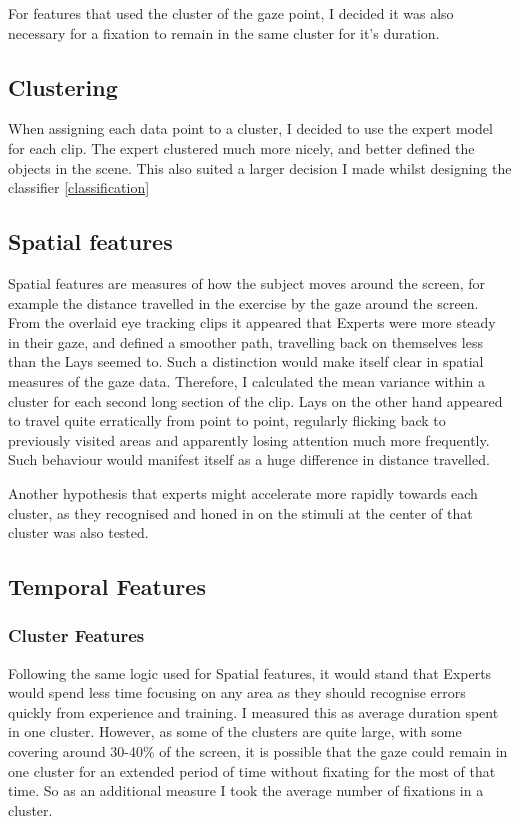 \documentclass{report}
\begin{document}
{				For features that used the cluster of the gaze point, I decided it was also necessary for a fixation to remain in the same cluster for it's duration.
				
			\subsection{Clustering}
				When assigning each data point to a cluster, I decided to use the expert model for each clip. The expert clustered much more nicely, and better defined the objects in the scene. This also suited a larger decision I made whilst designing the classifier \ref{classification}
				
			\subsection{Spatial features}
				Spatial features are measures of how the subject moves around the screen, for example the distance travelled in the exercise by the gaze around the screen.
				From the overlaid eye tracking clips it appeared that Experts were more steady in their gaze, and defined a smoother path, travelling back on themselves less than the Lays seemed to. Such a distinction would make itself clear in spatial measures of the gaze data. Therefore, I calculated the mean variance within a cluster for each second long section of the clip. 
				Lays on the other hand appeared to travel quite erratically from point to point, regularly flicking back to previously visited areas and apparently losing attention much more frequently. Such behaviour would manifest itself as a huge difference in distance travelled.
				
				Another hypothesis that experts might accelerate more rapidly towards each cluster, as they recognised and honed in on the stimuli at the center of that cluster was also tested.
			\newpage
			\subsection{Temporal Features}
				\subsubsection{Cluster Features}
					Following the same logic used for Spatial features, it would stand that Experts would spend less time focusing on any area as they should recognise errors quickly from experience and training. I measured this as average duration spent in one cluster. However, as some of the clusters are quite large, with some covering around 30-40\% of the screen, it is possible that the gaze could remain in one cluster for an extended period of time without fixating for the most of that time. So as an additional measure I took the average number of fixations in a cluster.
}
\end{document}
